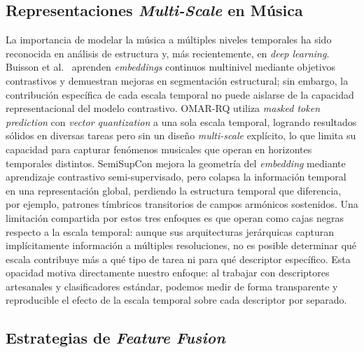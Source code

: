\documentclass[conference]{IEEEtran}
\begin{document}
\subsection{Representaciones \textit{Multi-Scale} en Música}
La importancia de modelar la música a múltiples niveles temporales ha sido reconocida en análisis de estructura \cite{serra2014unsupervised} y, más recientemente, en \textit{deep learning}.
Buisson et al.\ \cite{buisson2024self} aprenden \textit{embeddings} continuos multinivel mediante objetivos contrastivos y demuestran mejoras en segmentación estructural; sin embargo, la contribución
específica de cada escala temporal no puede aislarse de la capacidad representacional del modelo contrastivo.
OMAR-RQ \cite{alonso2025omar} utiliza \textit{masked token prediction} con \textit{vector quantization} a una sola escala temporal, logrando resultados sólidos en diversas tareas pero sin un diseño \textit{multi-scale} explícito, lo que limita su capacidad para capturar fenómenos musicales que operan en horizontes temporales distintos.
SemiSupCon \cite{guinot2024semi} mejora la geometría del \textit{embedding} mediante aprendizaje contrastivo semi-supervisado, pero colapsa la información temporal en una representación global, perdiendo la estructura temporal que diferencia, por ejemplo, patrones tímbricos 
transitorios de campos armónicos sostenidos.
Una limitación compartida por estos tres enfoques es que operan como cajas negras respecto a la escala temporal: aunque sus arquitecturas jerárquicas capturan implícitamente información a múltiples resoluciones, no es posible determinar qué escala contribuye más a qué tipo de tarea ni para qué descriptor específico.
Esta opacidad motiva directamente nuestro enfoque: al trabajar con descriptores artesanales y clasificadores estándar, podemos medir de forma transparente y reproducible el efecto de la escala temporal sobre cada descriptor por separado.

\subsection{Estrategias de \textit{Feature Fusion}}
\end{document}
